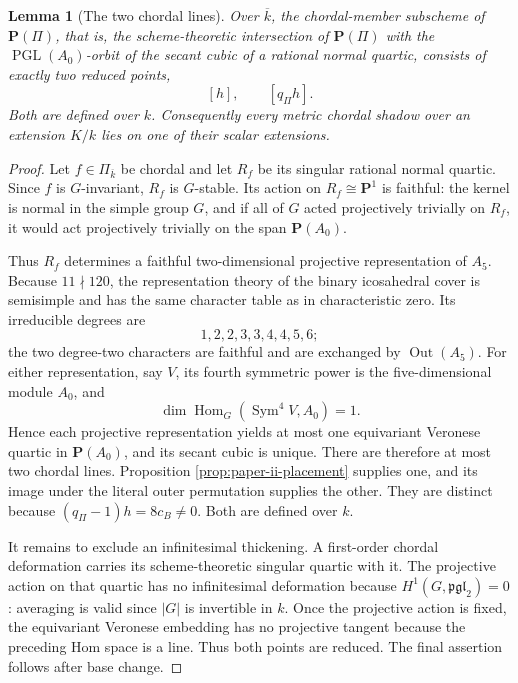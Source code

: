 \documentclass[11pt]{article}
\newtheorem{lemma}[theorem]{Lemma}
\theoremstyle{definition}
\theoremstyle{remark}
\newcommand{\PP}{\mathbf P}
\newcommand{\Sym}{\operatorname{Sym}}
\newcommand{\PGL}{\operatorname{PGL}}
\newcommand{\Hom}{\operatorname{Hom}}
\begin{document}
\begin{lemma}[The two chordal lines]
\label{lem:two-chordal-lines}
Over \(\overline{k}\), the chordal-member subscheme of \(\PP(\Pi)\), that is,
the scheme-theoretic intersection of \(\PP(\Pi)\) with the
\(\PGL(A_0)\)-orbit of the secant cubic of a rational normal quartic, consists
of exactly two reduced points,
\[
                         [h],\qquad[q_\Pi h].
\]
Both are defined over \(k\).  Consequently every metric chordal shadow over
an extension \(K/k\) lies on one of their scalar extensions.
\end{lemma}

\begin{proof}
Let \(f\in\Pi_{\overline{k}}\) be chordal and let \(R_f\) be its singular
rational normal quartic.  Since \(f\) is \(G\)-invariant, \(R_f\) is
\(G\)-stable.  Its action on \(R_f\cong\PP^1\) is faithful: the kernel is
normal in the simple group \(G\), and if all of \(G\) acted projectively
trivially on \(R_f\), it would act projectively trivially on the span
\(\PP(A_0)\).

Thus \(R_f\) determines a faithful two-dimensional projective representation
of \(A_5\).  Because \(11\nmid120\), the representation theory of the binary
icosahedral cover is semisimple and has the same character table as in
characteristic zero.  Its irreducible degrees are
\[
                       1,2,2,3,3,4,4,5,6;
\]
the two degree-two characters are faithful and are exchanged by
\(\operatorname{Out}(A_5)\).  For either representation,
say \(V\), its fourth symmetric power is the five-dimensional module
\(A_0\), and
\[
             \dim\Hom_G(\Sym^4V,A_0)=1.
\]
Hence each projective representation yields at most one equivariant
Veronese quartic in \(\PP(A_0)\), and its secant cubic is unique.  There are
therefore at most two chordal lines.  Proposition
\ref{prop:paper-ii-placement} supplies one, and its image under the literal
outer permutation supplies the other.  They are distinct because
\((q_\Pi-1)h=8c_B\ne0\).  Both are defined over \(k\).

It remains to exclude an infinitesimal thickening.  A first-order chordal
deformation carries its scheme-theoretic singular quartic with it.  The
projective action on that quartic has no infinitesimal deformation because
\(H^1(G,\mathfrak{pgl}_2)=0\): averaging is valid since \(|G|\) is invertible
in \(k\).  Once the projective action is fixed, the equivariant Veronese
embedding has no projective tangent because the preceding Hom space is a
line.  Thus both points are reduced.  The final assertion follows after
base change.
\end{proof}
\end{document}
